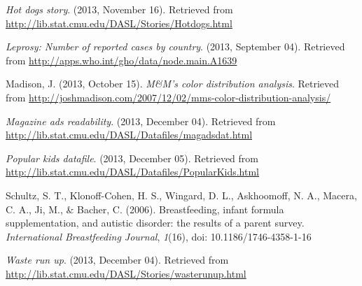 \documentclass[]{book}
\begin{document}
\emph{Hot dogs story}. (2013, November 16). Retrieved from
\url{http://lib.stat.cmu.edu/DASL/Stories/Hotdogs.html}

\emph{Leprosy: Number of reported cases by country}. (2013, September 04).
Retrieved from \url{http://apps.who.int/gho/data/node.main.A1639}

Madison, J. (2013, October 15). \emph{M\&M's color distribution analysis}.
Retrieved from
\url{http://joshmadison.com/2007/12/02/mms-color-distribution-analysis/}

\emph{Magazine ads readability}. (2013, December 04). Retrieved from
\url{http://lib.stat.cmu.edu/DASL/Datafiles/magadsdat.html}

\emph{Popular kids datafile}. (2013, December 05). Retrieved from
\url{http://lib.stat.cmu.edu/DASL/Datafiles/PopularKids.html}

Schultz, S. T., Klonoff-Cohen, H. S., Wingard, D. L., Askhoomoff, N. A.,
Macera, C. A., Ji, M., \& Bacher, C. (2006). Breastfeeding, infant
formula supplementation, and autistic disorder: the results of a parent
survey. \emph{International Breastfeeding Journal}, \emph{1}(16), doi:
10.1186/1746-4358-1-16

\emph{Waste run up}. (2013, December 04). Retrieved from
\url{http://lib.stat.cmu.edu/DASL/Stories/wasterunup.html}


\end{document}
